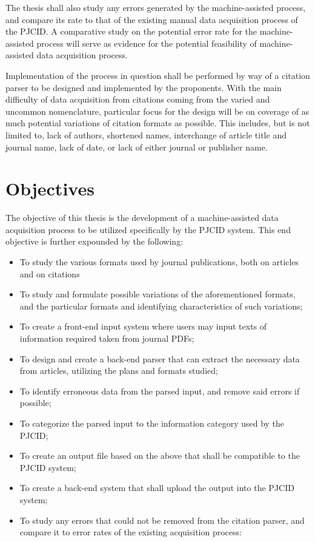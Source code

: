 The thesis shall also study any errors generated by the machine-assisted process, and compare its rate to that of the existing manual data acquisition process of the PJCID. A comparative study on the potential error rate for the machine-assisted process will serve as evidence for the potential feasibility of machine-assisted data acquisition process.

Implementation of the process in question shall be performed by way of a citation parser to be designed and implemented by the proponents. With the main difficulty of data acquisition from citations coming from the varied and uncommon nomenclature, particular focus for the design will be on coverage of as much potential variations of citation formats as possible. This includes, but is not limited to, lack of authors, shortened names, interchange of article title and journal name, lack of date, or lack of either journal or publisher name.

\section{Objectives}
The objective of this thesis is the development of a machine-assisted data acquisition process to be utilized specifically by the PJCID system. This end objective is further expounded by the following:
\begin{itemize}
	\item To study the various formats used by journal publications, both on articles and on citations
	\item To study and formulate possible variations of the aforementioned formats, and the particular formats and identifying characteristics of such variations;
	\item To create a front-end input system where users may input texts of information required taken from journal PDFs;
	\item To design and create a back-end parser that can extract the necessary data from articles, utilizing the plans and formats studied;
	\item To identify erroneous data from the parsed input, and remove said errors if possible;
	\item To categorize the parsed input to the information category used by the PJCID;
	\item To create an output file based on the above that shall be compatible to the PJCID system;
	\item To create a back-end system that shall upload the output into the PJCID system;
	\item To study any errors that could not be removed from the citation parser, and compare it to error rates of the existing acquisition process:
\end{itemize}

